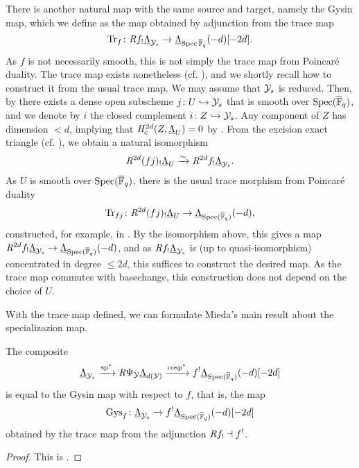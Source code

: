 \documentclass[../main.tex]{subfiles}
\begin{document}
There is another natural map with the same source and target, namely the 
Gysin map, which we define as the map obtained by adjunction from the trace map
\begin{equation*}
  \operatorname{Tr}_f\colon \mathit R f_! \underline \Lambda_{\mathcal{Y}_s} \to \underline \Lambda_{\operatorname{Spec} {\overline {\mathbb{F}}_q}}(-d)[-2d].
\end{equation*}
As $f$ is not necessarily smooth, this is not
simply the trace map from Poincar\'e duality. The trace map exists
nonetheless (cf. \cite[XVIII, Théorème 2.9]{SGA4}), and we shortly 
recall how to construct it from the usual trace map. We may assume that $\mathcal{Y}_s$
is reduced. Then, by \cite[\href{https://stacks.math.columbia.edu/tag/056V}{Tag
056V}]{stacks-project} 
there exists a dense open subscheme $j \colon U \hookrightarrow \mathcal{Y}_s$ that is smooth over 
$\operatorname{Spec}({\overline {\mathbb{F}}_q})$, and we denote by $i$ the closed complement 
$i \colon Z \hookrightarrow \mathcal{Y}_s$. Any component of $Z$ has dimension $< d$, implying that
$\mathit H^{2d}_c(Z, \underline \Lambda_U) = 0$ by \cite[Theorem 7.4.5]{LeiFuEtale}.
From the excision exact triangle (cf. \cite[Theorem 7.4.4 (iii)]{LeiFuEtale}),
we obtain a natural isomorphism
\begin{equation*}
  \mathit R^{2d} (fj)_! \underline \Lambda_U \xrightarrow{\sim} \mathit R^{2d} f_! \underline
  \Lambda_{\mathcal{Y}_s}.
\end{equation*}
As $U$ is smooth over $\operatorname{Spec}({\overline {\mathbb{F}}_q})$, there is the usual trace morphism from
Poincar\'e duality
\begin{equation*}
  \operatorname{Tr}_{fj}\colon \mathit R^{2d}(fj)_! \underline \Lambda_U \to \underline
  \Lambda_{\operatorname{Spec}({\overline {\mathbb{F}}_q})}(-d),
\end{equation*}
constructed, for example, in \cite[Section 8.2]{LeiFuEtale}. By the isomorphism
above, this gives a map $\mathit R^{2d} f_! \underline \Lambda_{\mathcal{Y}_s} \to \underline
\Lambda_{\operatorname{Spec}({\overline {\mathbb{F}}_q})}(-d)$, and as $\mathit R f_! \underline \Lambda_{\mathcal{Y}_s}$ is
(up to quasi-isomorphism) concentrated in degree $\leq 2d$, this suffices to
construct the desired map. As the trace map commutes with basechange, this construction
does not depend on the choice of $U$.

With the trace map defined, we can formulate Mieda's main result about the
specializazion map.
\begin{prop}\label{prop:MiedaFirstStepSpecMap}
  The composite 
  \begin{equation*}
    \underline{\Lambda}_{\mathcal{Y}_s} \xrightarrow{\mathrm{sp}^*} \mathit R \Psi_{\mathcal{Y}} \underline
    \Lambda_{d(\mathcal{Y})} \xrightarrow{\mathrm{cosp}^*} f^! \underline
    \Lambda_{\operatorname{Spec}({\overline {\mathbb{F}}_q})}(-d)[-2d]
  \end{equation*}
  is equal to the Gysin map with respect to $f$, that is, the map
  \begin{equation*}
    \mathrm{Gys}_f \colon \underline \Lambda_{\mathcal{Y}_s} \to f^! \underline
    \Lambda_{\operatorname{Spec}({\overline {\mathbb{F}}_q})}(-d)[-2d]
  \end{equation*}
  obtained by the trace map from the adjunction $\mathit R f_! \dashv f^!$.
  \begin{proof}
    This is \cite[Theorem 2.1]{mieda2016geometric}.
  \end{proof}
\end{prop}
\end{document}
